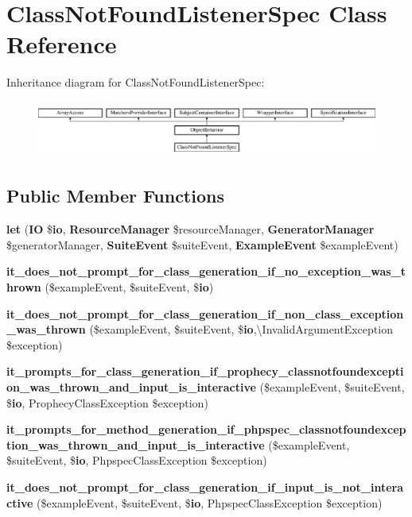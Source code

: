 \section{Class\+Not\+Found\+Listener\+Spec Class Reference}
\label{classspec_1_1_php_spec_1_1_listener_1_1_class_not_found_listener_spec}
Inheritance diagram for Class\+Not\+Found\+Listener\+Spec\+:\begin{figure}[H]
\begin{center}
\leavevmode
\includegraphics[height=1.866667cm]{classspec_1_1_php_spec_1_1_listener_1_1_class_not_found_listener_spec}
\end{center}
\end{figure}
\subsection*{Public Member Functions}
\begin{DoxyCompactItemize}
\item 
{\bf let} ({\bf I\+O} \${\bf io}, {\bf Resource\+Manager} \$resource\+Manager, {\bf Generator\+Manager} \$generator\+Manager, {\bf Suite\+Event} \$suite\+Event, {\bf Example\+Event} \$example\+Event)
\item 
{\bf it\+\_\+does\+\_\+not\+\_\+prompt\+\_\+for\+\_\+class\+\_\+generation\+\_\+if\+\_\+no\+\_\+exception\+\_\+was\+\_\+thrown} (\$example\+Event, \$suite\+Event, \${\bf io})
\item 
{\bf it\+\_\+does\+\_\+not\+\_\+prompt\+\_\+for\+\_\+class\+\_\+generation\+\_\+if\+\_\+non\+\_\+class\+\_\+exception\+\_\+was\+\_\+thrown} (\$example\+Event, \$suite\+Event, \${\bf io},\textbackslash{}Invalid\+Argument\+Exception \$exception)
\item 
{\bf it\+\_\+prompts\+\_\+for\+\_\+class\+\_\+generation\+\_\+if\+\_\+prophecy\+\_\+classnotfoundexception\+\_\+was\+\_\+thrown\+\_\+and\+\_\+input\+\_\+is\+\_\+interactive} (\$example\+Event, \$suite\+Event, \${\bf io}, Prophecy\+Class\+Exception \$exception)
\item 
{\bf it\+\_\+prompts\+\_\+for\+\_\+method\+\_\+generation\+\_\+if\+\_\+phpspec\+\_\+classnotfoundexception\+\_\+was\+\_\+thrown\+\_\+and\+\_\+input\+\_\+is\+\_\+interactive} (\$example\+Event, \$suite\+Event, \${\bf io}, Phpspec\+Class\+Exception \$exception)
\item 
{\bf it\+\_\+does\+\_\+not\+\_\+prompt\+\_\+for\+\_\+class\+\_\+generation\+\_\+if\+\_\+input\+\_\+is\+\_\+not\+\_\+interactive} (\$example\+Event, \$suite\+Event, \${\bf io}, Phpspec\+Class\+Exception \$exception)
\end{DoxyCompactItemize}
